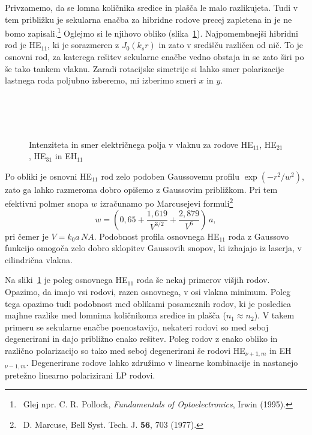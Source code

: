 Privzamemo, da se lomna količnika sredice in plašča le malo razlikujeta. Tudi v tem 
približku je sekularna enačba za hibridne rodove precej zapletena in je ne bomo 
zapisali.\footnote{~Glej npr. C. R. Pollock, {\it Fundamentals of Optoelectronics}, Irwin (1995).}
Oglejmo si le njihovo obliko (slika~\ref{fig:HE11}). Najpomembnejši hibridni rod je HE$_{11}$, 
ki je sorazmeren z $J_0(k_sr)$ in zato v središču različen od nič. 
To je osnovni rod, za katerega rešitev sekularne enačbe vedno obstaja in se
zato širi po še tako tankem vlaknu. Zaradi rotacijske simetrije si lahko smer 
polarizacije lastnega roda poljubno izberemo, mi izberimo smeri $x$ in $y$.
\begin{figure}[ht]
\centering
\def\svgwidth{80truemm} 
\\
\def\svgwidth{80truemm} 
 \\
\def\svgwidth{80truemm} 
 \\
\def\svgwidth{80truemm} 

\caption{Intenziteta in smer električnega polja v vlaknu za rodove
HE$_{11}$, HE$_{21}$, HE$_{31}$ in EH$_{11}$}
\label{fig:HE11}
\end{figure}
Po obliki je osnovni HE$_{11}$ rod zelo podoben Gaussovemu profilu $\exp(-r^2/w^2)$,
zato ga lahko razmeroma dobro opišemo z Gaussovim približkom. 
Pri tem efektivni polmer snopa
$w$ izračunamo po Marcusejevi
 formuli\footnote{~D. Marcuse, Bell Syst. Tech. J. $\mathbf{56}$, 
703 (1977).}
\begin{equation} 
w = \left(0,65 + \frac{1,619}{V^{3/2}}+\frac{2,879}{V^{6}}\right)\,a,
\label{Marcuse}
\end{equation}
pri čemer je $V = k_0 a\,NA $. Podobnost profila osnovnega
HE$_{11}$ roda z Gaussovo funkcijo omogoča zelo dobro sklopitev Gaussovih
snopov, ki izhajajo iz laserja, v cilindrična vlakna.

Na sliki~\ref{fig:HE11} je poleg osnovnega HE$_{11}$ roda še nekaj primerov višjih rodov. Opazimo, 
da imajo vsi rodovi, razen osnovnega, v osi vlakna minimum. Poleg tega opazimo tudi podobnost med 
oblikami posameznih rodov, ki je posledica majhne razlike med lomnima količnikoma sredice in plašča
($n_1 \approx n_2$). V takem primeru se sekularne enačbe poenostavijo, nekateri rodovi so 
med seboj degenerirani in dajo približno enako rešitev. 
Poleg rodov z enako obliko in različno polarizacijo so tako 
med seboj degenerirani še rodovi HE$_{\nu+1,m}$ in EH$_{\nu-1,m}$. Degenerirane 
rodove lahko združimo v linearne kombinacije in nastanejo pretežno 
linearno polarizirani LP rodovi. 

